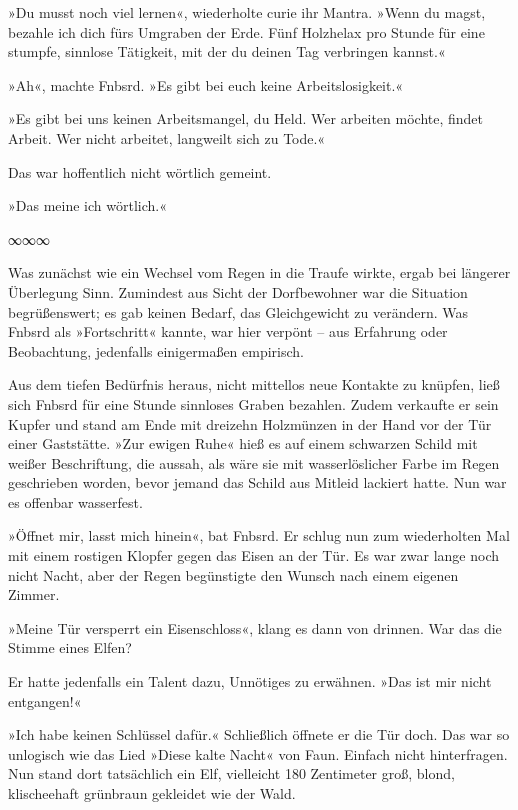 »Du musst noch viel lernen«, wiederholte curie ihr Mantra. »Wenn du magst, bezahle ich dich fürs Umgraben der Erde. Fünf Holzhelax pro Stunde für eine stumpfe, sinnlose Tätigkeit, mit der du deinen Tag verbringen kannst.«

»Ah«, machte Fnbsrd. »Es gibt bei euch keine Arbeitslosigkeit.«

»Es gibt bei uns keinen Arbeitsmangel, du Held. Wer arbeiten möchte, findet Arbeit. Wer nicht arbeitet, langweilt sich zu Tode.«

Das war hoffentlich nicht wörtlich gemeint.

»Das meine ich wörtlich.«

\begin{center}
∞∞∞
\end{center}

Was zunächst wie ein Wechsel vom Regen in die Traufe wirkte, ergab bei längerer Überlegung Sinn. Zumindest aus Sicht der Dorfbewohner war die Situation begrüßenswert; es gab keinen Bedarf, das Gleichgewicht zu verändern. Was Fnbsrd als »Fortschritt« kannte, war hier verpönt – aus Erfahrung oder Beobachtung, jedenfalls einigermaßen empirisch.

Aus dem tiefen Bedürfnis heraus, nicht mittellos neue Kontakte zu knüpfen, ließ sich Fnbsrd für eine Stunde sinnloses Graben bezahlen. Zudem verkaufte er sein Kupfer und stand am Ende mit dreizehn Holzmünzen in der Hand vor der Tür einer Gaststätte. »Zur ewigen Ruhe« hieß es auf einem schwarzen Schild mit weißer Beschriftung, die aussah, als wäre sie mit wasserlöslicher Farbe im Regen geschrieben worden, bevor jemand das Schild aus Mitleid lackiert hatte. Nun war es offenbar wasserfest.

»Öffnet mir, lasst mich hinein«, bat Fnbsrd. Er schlug nun zum wiederholten Mal mit einem rostigen Klopfer gegen das Eisen an der Tür. Es war zwar lange noch nicht Nacht, aber der Regen begünstigte den Wunsch nach einem eigenen Zimmer.

»Meine Tür versperrt ein Eisenschloss«, klang es dann von drinnen. War das die Stimme eines Elfen?

Er hatte jedenfalls ein Talent dazu, Unnötiges zu erwähnen. »Das ist mir nicht entgangen!«

»Ich habe keinen Schlüssel dafür.« Schließlich öffnete er die Tür doch. Das war so unlogisch wie das Lied »Diese kalte Nacht« von Faun. Einfach nicht hinterfragen. Nun stand dort tatsächlich ein Elf, vielleicht 180 Zentimeter groß, blond, klischeehaft grünbraun gekleidet wie der Wald.

